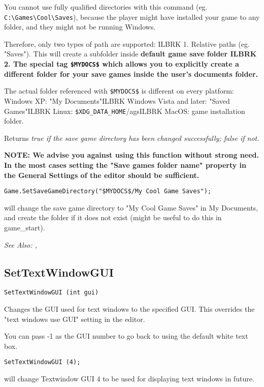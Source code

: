 You cannot use fully qualified directories with this command (eg. \verb$C:\Games\Cool\Saves$), because
the player might have installed your game to any folder, and they might not be running Windows.

Therefore, only two types of path are supported: ILBRK
1. Relative paths (eg. "Saves"). This will create a subfolder inside \bf{default game save folder} ILBRK
2. The special tag \verb!$MYDOCS$! which allows you to explicitly create a different folder for your save games
inside the user's documents folder.

The actual folder referenced with \verb!$MYDOCS$! is different on every platform:
Windows XP: "My Documents"ILBRK
Windows Vista and later: "Saved Games"ILBRK
Linux: \verb!$XDG_DATA_HOME!/agsILBRK
MacOS: game installation folder.

Returns \it{true} if the save game directory has been changed successfully; \it{false} if not.

\bf{NOTE:} We advise you against using this function without strong need. In the most cases setting the
"Save games folder name" property in the General Settings of the editor should be sufficient.

\begin{verbatim}
Game.SetSaveGameDirectory("$MYDOCS$/My Cool Game Saves");
\end{verbatim}
will change the save game directory to "My Cool Game Saves" in My Documents, and create the
folder if it does not exist (might be useful to do this in game_start).

\it{See Also:} ,


\subsection{SetTextWindowGUI}\label{SetTextWindowGUI}%

\begin{verbatim}
SetTextWindowGUI (int gui)
\end{verbatim}
Changes the GUI used for text windows to the specified GUI. This overrides
the "text windows use GUI" setting in the editor.

You can pass -1 as the GUI number to go back to using the default white text box.

\begin{verbatim}
SetTextWindowGUI (4);
\end{verbatim}
will change Textwindow GUI 4 to be used for displaying text windows in future.


